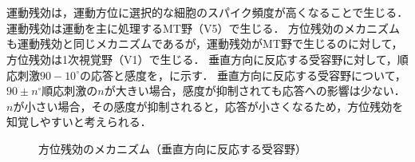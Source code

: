 \section{\consideration}
運動残効は，運動方位に選択的な細胞のスパイク頻度が高くなることで生じる．運動残効は運動を主に処理するMT野（V5）で生じる．
方位残効のメカニズムも運動残効と同じメカニズムであるが，運動残効がMT野で生じるのに対して，方位残効は1次視覚野（V1）で生じる．
垂直方向に反応する受容野に対して，順応刺激\(90-10^\circ\)の応答と感度を，に示す．
垂直方向に反応する受容野について，\(90\pm n^\circ\)順応刺激の\(n\)が大きい場合，感度が抑制されても応答への影響は少ない．
\(n\)が小さい場合，その感度が抑制されると，応答が小さくなるため，方位残効を知覚しやすいと考えられる．
\begin{figure}[H]
    \centering
    
    \caption{方位残効のメカニズム（垂直方向に反応する受容野）}
    \label{fig:方位残効のメカニズム}
\end{figure}
